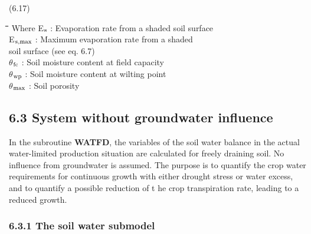 \documentclass[11pt]{article}
\begin{document}
\bigskip
\strut\hfill (6.17)

\bigskip
\bigskip
\nwln
\begin{tabbing}
\hspace{1.27cm}\=\hspace{1.27cm}\=\hspace{1.27cm}\=\hspace{1.27cm}\=%
\hspace{1.27cm}\=\hspace{1.27cm}\=\hspace{1.27cm}\=\hspace{1.27cm}\=%
\hspace{1.27cm}\=\hspace{1.27cm}\=\kill
Where\> \> E$_{{\rm s}}$\> : Evaporation rate from a shaded soil surface\> \> \> \> \> \> \> [cm d$^{{\rm -1}}$]\\
\>\> E$_{{\rm s,max}}$\> : Maximum evaporation rate from a shaded \\
\>\> \>   soil surface (see eq. 6.7)\> \> \> \> \> \> \> [cm d$^{{\rm -1}}$]\\
\>\> $\theta$$_{{\rm fc}}$\> : Soil moisture content at field capacity\> \> \> \> \> \> \> [cm$^{{\rm 3}}$ cm$^{{\rm -3}}$]\\
\>\> $\theta$$_{{\rm wp}}$\> : Soil moisture content at wilting point\> \> \> \> \> \> \> [cm$^{{\rm 3}}$ cm$^{{\rm -3}}$]\\
\>\> $\theta$$_{{\rm max}}$\> : Soil porosity\> \> \> \> \> \> \> [cm$^{{\rm 3}}$ cm$^{{\rm -3}}$]
\end{tabbing}
\newpage

\subsection{  6.3 System without groundwater influence  }

In the subroutine {\bf WATFD}, the variables of the soil water balance in the actual water-limited produc\-tion situation are calculated for freely draining soil. No influence from
groundwater is assumed. The purpose is to quantify the crop water requirements for
continuous growth with either drought stress or water excess, and to quantify a possible
reduction of t  he crop transpiration rate, leading to a reduced growth.

\bigskip
\bigskip

\subsubsection{  6.3.1 The soil water submodel  }
\end{document}

